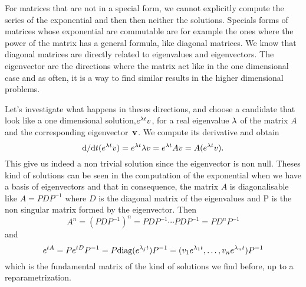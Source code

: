 For matrices that are not in a special form, we cannot explicitly compute the series of the exponential and then then neither the solutions. Specials forms of matrices whose exponential are commutable are for example the ones where the power of the matrix has a general formula, like diagonal matrices. We know that diagonal matrices are directly related to eigenvalues and eigenvectors. The eigenvector are the directions where the matrix act like in the one dimensional case and as often, it is a way to find similar results in the higher dimensional problems.

Let's investigate what happens in theses directions, and choose a candidate that look like a one dimensional solution,$e^{\lambda t}v$, for a real eigenvalue $\lambda$ of the matrix $A$ and the corresponding eigenvector~$\mathbf{v}$. We compute its derivative and obtain 
\[\mathrm{d}/{\mathrm{d} t}(e^{\lambda t}v) =  e^{\lambda t}\lambda v = e^{\lambda t}Av = A(e^{\lambda t}v).\]
This give us indeed a non trivial solution since the eigenvector is non null. Theses kind of solutions can be seen in the computation of the exponential when we have a basis of eigenvectors and that in consequence, the matrix $A$ is diagonalisable like $A=PDP^{-1}$ where $D$ is the diagonal matrix of the eigenvalues and P is the non singular matrix formed by the eigenvector. Then 
\[ A^n= (PDP^{-1})^n = PDP^{-1}\cdots PDP^{-1} = PD^nP^{-1} \]
and 
\[ e^{tA} 
= Pe^{tD}P^{-1} 
= P\text{diag}(e^{\lambda_jt})P^{-1} 
= (v_1e^{\lambda_1t},\dots,v_ne^{\lambda_nt})P^{-1} 
\]
which is the fundamental matrix of the kind of solutions we find before, up to a reparametrization.

